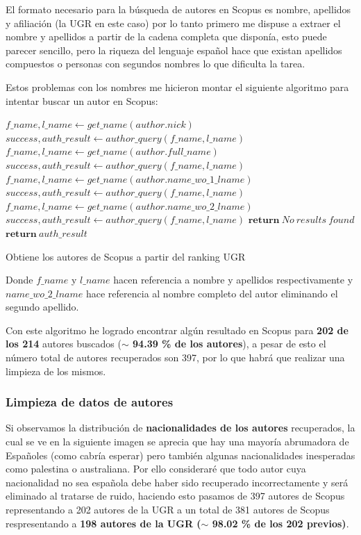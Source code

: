 El formato necesario para la búsqueda de autores en Scopus es nombre, apellidos y afiliación (la \acrshort{UGR} en este caso) por lo tanto primero me dispuse a extraer el nombre y apellidos a partir de la cadena completa que disponía, esto puede parecer sencillo, pero la riqueza del lenguaje español hace que existan apellidos compuestos o personas con segundos nombres lo que dificulta la tarea.

Estos problemas con los nombres me hicieron montar el siguiente algoritmo para intentar buscar un autor en Scopus:


\begin{algorithm}[h]
	\begin{algorithmic} 
		\State $f\_name, l\_name \gets get\_name(author.nick)$
		\State $success, auth\_result  \gets author\_query(f\_name, l\_name)$
		\State $f\_name, l\_name \gets get\_name(author.full\_name)$
		\State $success, auth\_result  \gets author\_query(f\_name, l\_name)$
		\State $f\_name, l\_name \gets get\_name(author.name\_wo\_1\_lname)$
		\State $success, auth\_result  \gets author\_query(f\_name, l\_name)$
		\State $f\_name, l\_name \gets get\_name(author.name\_wo\_2\_lname)$
		\State $success, auth\_result  \gets author\_query(f\_name, l\_name)$
		\State $\textbf{return}\ No\ results\ found$
		\EndIf
		\EndIf
		\EndIf
		\EndIf
		\State $\textbf{return}\ auth\_result$
	
		\EndFor
	\end{algorithmic}  
	\caption{Obtiene los autores de Scopus a partir del ranking UGR}	
\end{algorithm}


Donde $f\_name$ y $l\_name$ hacen referencia a nombre y apellidos respectivamente y $name\_wo\_2\_lname$ hace referencia al nombre completo del autor eliminando el segundo apellido.

Con este algoritmo he logrado encontrar algún resultado en Scopus para \textbf{202 de los 214} autores buscados (\textbf{$\sim$ 94.39 \% de los autores}), a pesar de esto el número total de autores recuperados son 397, por lo que habrá que realizar una limpieza de los mismos.

\subsubsection{Limpieza de datos de autores}
Si observamos la distribución de \textbf{nacionalidades de los autores} recuperados, la cual se ve en la siguiente imagen se aprecia que hay una mayoría abrumadora de Españoles (como cabría esperar) pero también algunas nacionalidades inesperadas como palestina o australiana. Por ello consideraré que todo autor cuya nacionalidad no sea española debe haber sido recuperado incorrectamente y será eliminado al tratarse de ruido, haciendo esto pasamos de 397 autores de Scopus representando a 202 autores de la \acrshort{UGR} a un total de 381 autores de Scopus respresentando a \textbf{198 autores de la \acrshort{UGR} ($\sim$ 98.02 \% de los 202 previos)}.

